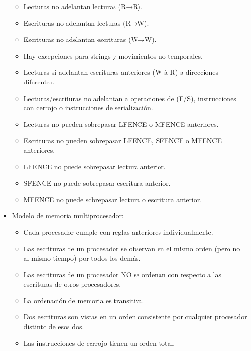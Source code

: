 \documentclass[12pt, twoside, openright]{report} %
\begin{document}
\begin{itemize}
\begin{itemize}
      \item
        Lecturas no adelantan lecturas (R→R).
      \item
        Escrituras no adelantan lecturas (R→W).
      \item
        Escrituras no adelantan escrituras (W→W).
      \item
        Hay excepciones para strings y movimientos no temporales.
      \item
        Lecturas si adelantan escrituras anteriores (W à R) a
        direcciones diferentes.
      \item
        Lecturas/escrituras no adelantan a operaciones de (E/S),
        instrucciones con cerrojo o instrucciones de serialización.
      \item
        Lecturas no pueden sobrepasar LFENCE o MFENCE anteriores.
      \item
        Escrituras no pueden sobrepasar LFENCE, SFENCE o MFENCE
        anteriores.
      \item
        LFENCE no puede sobrepasar lectura anterior.
      \item
        SFENCE no puede sobrepasar escritura anterior.
      \item
        MFENCE no puede sobrepasar lectura o escritura anterior.
      \end{itemize}
    \item
      Modelo de memoria multiprocesador:

      \begin{itemize}
      
      \item
        Cada procesador cumple con reglas anteriores individualmente.
      \item
        Las escrituras de un procesador se observan en el mismo orden
        (pero no al mismo tiempo) por todos los demás.
      \item
        Las escrituras de un procesador NO se ordenan con respecto a
        las escrituras de otros procesadores.
      \item
        La ordenación de memoria es transitiva.
      \item
        Dos escrituras son vistas en un orden consistente por
        cualquier procesador distinto de esos dos.
      \item
        Las instrucciones de cerrojo tienen un orden total.
      \end{itemize}
    \end{itemize}
\end{document}
